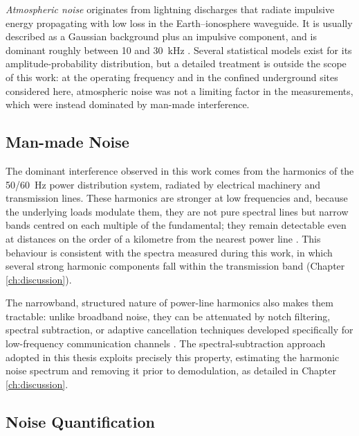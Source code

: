 \emph{Atmospheric noise} originates from lightning discharges that radiate
impulsive energy propagating with low loss in the Earth--ionosphere waveguide. It
is usually described as a Gaussian background plus an impulsive component, and is
dominant roughly between 10 and 30~kHz \cite{carreno2016through}. Several statistical
models exist for its amplitude-probability distribution, but a detailed treatment
is outside the scope of this work: at the operating frequency and in the confined
underground sites considered here, atmospheric noise was not a limiting factor in
the measurements, which were instead dominated by man-made interference.

\subsection{Man-made Noise}
\label{sec:manmade_noise}

The dominant interference observed in this work comes from the harmonics of the
50/60~Hz power distribution system, radiated by electrical machinery and
transmission lines. These harmonics are stronger at low frequencies and, because
the underlying loads modulate them, they are not pure spectral lines but narrow
bands centred on each multiple of the fundamental; they remain detectable even at
distances on the order of a kilometre from the nearest power
line \cite{carreno2016through}. This behaviour is consistent with the spectra measured
during this work, in which several strong harmonic components fall within the
transmission band (Chapter \ref{ch:discussion}).

The narrowband, structured nature of power-line harmonics also makes them
tractable: unlike broadband noise, they can be attenuated by notch filtering,
spectral subtraction, or adaptive cancellation techniques developed specifically
for low-frequency communication
channels \cite{cohen2010, wang2018adaptive}. The spectral-subtraction approach adopted in
this thesis exploits precisely this property, estimating the harmonic noise
spectrum and removing it prior to demodulation, as detailed in
Chapter \ref{ch:discussion}.

\subsection{Noise Quantification}
\label{sec:noise_quantification}

